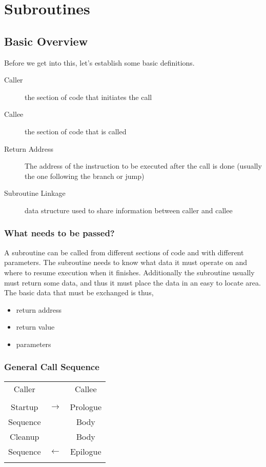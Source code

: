 \chapter{Subroutines}
\label{c-subs}


\section{Basic Overview}

Before we get into this, let's establish some basic definitions.

\begin{description}
  \item[Caller] the section of code that initiates the call
  \item[Callee] the section of code that is called
  \item[Return Address] The address of the instruction to be
  executed after the call is done (usually the one following the
  branch or jump)
  \item[Subroutine Linkage]   data structure used to share information between
  caller and callee
\end{description}

\subsection{What needs to be passed?}

A subroutine can be called from different sections of code and with different parameters.  The subroutine needs to know what data it must operate on and where to resume execution when it finishes.  Additionally the subroutine usually must return some data, and thus it must place the data in an easy to locate area.  The basic data that must be exchanged is thus,

\begin{itemize}
    \item return address
    \item return value
    \item parameters
\end{itemize}

\subsection{General Call Sequence}

\begin{tabular}{|c|c|c|}
  \multicolumn{1}{c}{Caller} & \multicolumn{1}{c}{ } & \multicolumn{1}{c}{Callee} \\
  & & \\
  \cline{1-1} \cline{3-3}
  Startup  & $\rightarrow$ & Prologue \\ \cline{3-3}
  Sequence &   & Body \\ \cline{1-1}
  Cleanup  &   & Body \\ \cline{3-3}
  Sequence & $\leftarrow$ & Epilogue \\ \cline{1-1} \cline{3-3}
  & & \\
\end{tabular}

